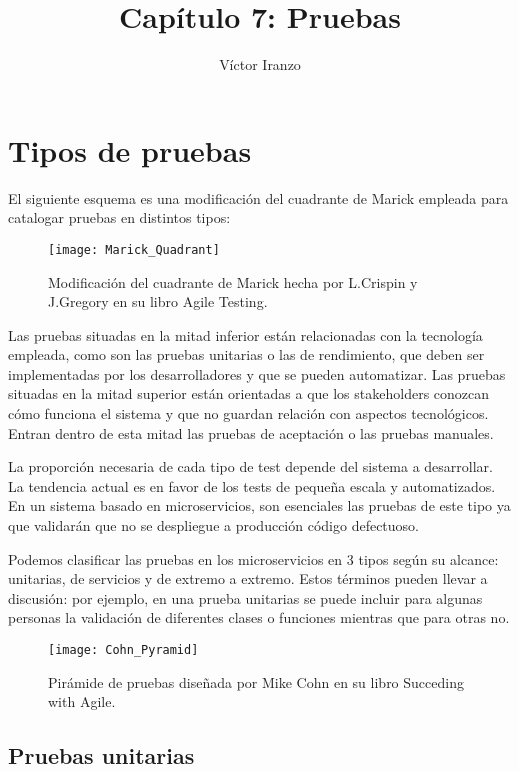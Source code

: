 \documentclass[11pt,a4paper]{article}
\author{Víctor Iranzo}
\title{Capítulo 7: Pruebas}
\begin{document}
\maketitle

\section{Tipos de pruebas}

El siguiente esquema es una modificación del cuadrante de Marick  empleada para catalogar pruebas en distintos tipos:

\begin{figure}[h]
\centering
\texttt{[image: Marick\_Quadrant]}
\caption{Modificación del cuadrante de Marick hecha por L.Crispin y J.Gregory en su libro Agile Testing.}
\end{figure}

Las pruebas situadas en la mitad inferior están relacionadas con la tecnología empleada, como son las pruebas unitarias o las de rendimiento, que deben ser implementadas por los desarrolladores y que se pueden automatizar. Las pruebas situadas en la mitad superior están orientadas a que los stakeholders conozcan cómo funciona el sistema y que no guardan relación con aspectos tecnológicos. Entran dentro de esta mitad las pruebas de aceptación o las pruebas manuales.

La proporción necesaria de cada tipo de test depende del sistema a desarrollar. La tendencia actual es en favor de los tests de pequeña escala y automatizados. En un sistema basado en microservicios, son esenciales las pruebas de este tipo ya que validarán que no se despliegue a producción código defectuoso.

Podemos clasificar las pruebas en los microservicios en 3 tipos según su alcance: unitarias, de servicios y de extremo a extremo. Estos términos pueden llevar a discusión: por ejemplo, en una prueba unitarias se puede incluir para algunas personas la validación de diferentes clases o funciones mientras que para otras no.

\begin{figure}[h]
\centering
\texttt{[image: Cohn\_Pyramid]}
\caption{Pirámide de pruebas diseñada por Mike Cohn en su libro Succeding with Agile.}
\end{figure}


\subsection{Pruebas unitarias}
\end{document}
